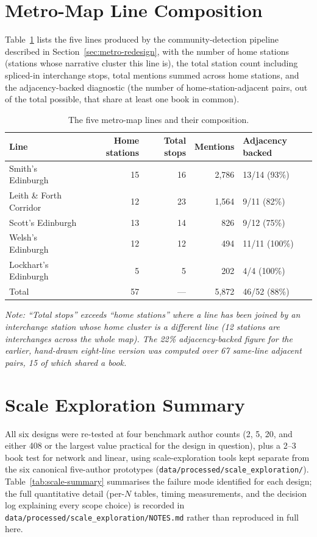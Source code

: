 \documentclass[logo,msc]{infthesis}
\begin{document}
\section{Metro-Map Line Composition}
\label{app:metro}

Table~\ref{tab:metro-lines} lists the five lines produced by the community-detection pipeline described in Section~\ref{sec:metro-redesign}, with the number of home stations (stations whose narrative cluster this line is), the total station count including spliced-in interchange stops, total mentions summed across home stations, and the adjacency-backed diagnostic (the number of home-station-adjacent pairs, out of the total possible, that share at least one book in common).

\begin{table}[h]
\centering
\caption{The five metro-map lines and their composition.}
\label{tab:metro-lines}
\small
\begin{tabular}{lrrrl}
\toprule
Line & Home stations & Total stops & Mentions & Adjacency backed \\
\midrule
Smith's Edinburgh & 15 & 16 & 2{,}786 & 13/14 (93\%) \\
Leith \& Forth Corridor & 12 & 23 & 1{,}564 & 9/11 (82\%) \\
Scott's Edinburgh & 13 & 14 & 826 & 9/12 (75\%) \\
Welsh's Edinburgh & 12 & 12 & 494 & 11/11 (100\%) \\
Lockhart's Edinburgh & 5 & 5 & 202 & 4/4 (100\%) \\
\midrule
Total & 57 & --- & 5{,}872 & 46/52 (88\%) \\
\bottomrule
\end{tabular}
\end{table}

\noindent\small\textit{Note: ``Total stops'' exceeds ``home stations'' where a line has been joined by an interchange station whose home cluster is a different line (12 stations are interchanges across the whole map). The 22\% adjacency-backed figure for the earlier, hand-drawn eight-line version was computed over 67 same-line adjacent pairs, 15 of which shared a book.}

\section{Scale Exploration Summary}
\label{app:scale}

All six designs were re-tested at four benchmark author counts (2, 5, 20, and either 408 or the largest value practical for the design in question), plus a 2--3 book test for network and linear, using scale-exploration tools kept separate from the six canonical five-author prototypes (\texttt{data/processed/scale\_exploration/}). Table~\ref{tab:scale-summary} summarises the failure mode identified for each design; the full quantitative detail (per-$N$ tables, timing measurements, and the decision log explaining every scope choice) is recorded in \texttt{data/processed/scale\_exploration/NOTES.md} rather than reproduced in full here.
\end{document}
